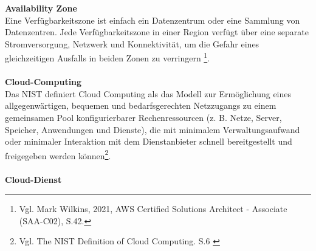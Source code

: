 \textbf{Availability Zone}\\
Eine Verfügbarkeitszone ist einfach ein Datenzentrum oder eine Sammlung von Datenzentren. Jede Verfügbarkeitszone in einer Region verfügt über eine separate Stromversorgung, Netzwerk und Konnektivität, um die Gefahr eines gleichzeitigen Ausfalls in beiden Zonen zu verringern \footnote{Vgl. Mark Wilkins, 2021, AWS Certified Solutions Architect - Associate (SAA-C02), S.42.\cite{AWS1}}.
\\\\
\textbf{Cloud-Computing}\\
Das NIST definiert Cloud Computing als das Modell zur Ermöglichung eines allgegenwärtigen, bequemen und bedarfsgerechten Netzzugangs zu einem gemeinsamen Pool konfigurierbarer Rechenressourcen (z. B. Netze, Server, Speicher, Anwendungen und Dienste), die mit minimalem Verwaltungsaufwand oder minimaler Interaktion mit dem Dienstanbieter schnell bereitgestellt und freigegeben werden können\footnote{Vgl. The NIST Definition of Cloud Computing. S.6
  \cite{CC1}}.
\\\\
\textbf{Cloud-Dienst}\\
